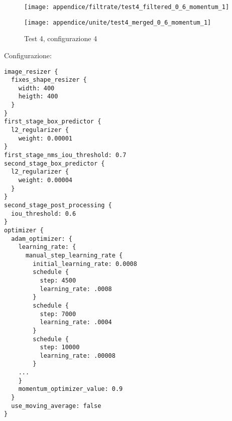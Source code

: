 \newpage
\begin{figure}[H]  
    \begin{minipage}{.5\columnwidth}  
        \centering  
        \texttt{[image: appendice/filtrate/test4\_filtered\_0\_6\_momentum\_1]}  
    \end{minipage}%
    \begin{minipage}{0.5\columnwidth}  
        \centering  
        \texttt{[image: appendice/unite/test4\_merged\_0\_6\_momentum\_1]}  
    \end{minipage}  
    \caption{Test 4, configurazione 4}
\end{figure}%
Configurazione:
\begin{multicols}{2}
    \begin{lstlisting}
image_resizer {
  fixes_shape_resizer {
    width: 400
    heigth: 400
  }
}
first_stage_box_predictor {
  l2_regularizer {
    weight: 0.00001
}
first_stage_nms_iou_threshold: 0.7
second_stage_box_predictor {
  l2_regularizer {
    weight: 0.00004
  }
}
second_stage_post_processing {
  iou_threshold: 0.6
}
optimizer {
  adam_optimizer: {
    learning_rate: {
      manual_step_learning_rate {
        initial_learning_rate: 0.0008
        schedule {
          step: 4500
          learning_rate: .0008
        }
        schedule {
          step: 7000
          learning_rate: .0004
        }
        schedule {
          step: 10000
          learning_rate: .00008
        }
    ...
    }
    momentum_optimizer_value: 0.9
  }
  use_moving_average: false
}
    \end{lstlisting}
\end{multicols}

